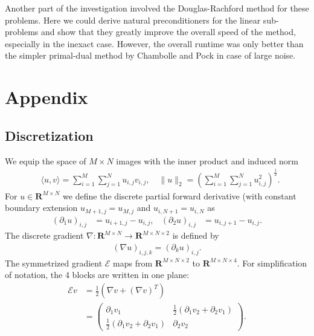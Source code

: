 \documentclass[twocolumn,envcountsame]{svjour3}
\newcommand{\RR}{\mathbf{R}}
\begin{document}
Another part of the investigation involved the Douglas-Rachford method for these problems. Here we could derive natural preconditioners for the linear sub-problems and show that they greatly improve the overall speed of the method, especially in the inexact case. However, the overall runtime was only better than the simpler primal-dual method by Chambolle and Pock in case of large noise.


\appendix
\section{Appendix}

\subsection{Discretization}
\label{sec:discretization}

We equip the space of  $M\times N$ images with the inner product and induced norm
\begin{align*}
  &\langle u,v\rangle=\sum_{i=1}^M\sum_{j=1}^N u_{i,j}v_{i,j},\quad \|u\|_2
  =\left(\sum_{i=1}^M\sum_{j=1}^N u_{i,j}^2\right)^{\frac{1}{2}}.
\end{align*}
 For $u\in\RR^{M\times N}$ we define the discrete partial forward derivative (with constant boundary
 extension $u_{M+1,j}=u_{M,j}$ and $u_{i,N+1}=u_{i,N}$ as
  \begin{align*}
    (\partial_1u)_{i,j}&=u_{i+1,j}-u_{i,j}, &
    (\partial_2u)_{i,j}&=u_{i,j+1}-u_{i,j}.
  \end{align*}
  The discrete gradient $\nabla:\RR^{M\times N}\to\RR^{M\times N\times 2}$ is defined by
  \begin{align*}
    (\nabla u)_{i,j,k}=(\partial_ku)_{i,j}.
  \end{align*}
 The symmetrized gradient $\mathcal{E}$ maps from $\RR^{M\times N \times 2}$ to $\RR^{M\times N\times
4}$. For simplification of notation, the 4 blocks are written in one plane:
\begin{align*}
  \mathcal{E}v&=\frac{1}{2}\left(\nabla v+(\nabla v)^T\right)\\
  &=
  \begin{pmatrix}
    \partial_1v_1 & \frac{1}{2}(\partial_1v_2+\partial_2v_1)\\
	\frac{1}{2}(\partial_1v_2+\partial_2v_1) & \partial_2v_2
      \end{pmatrix}.
\end{align*}
 
\end{document}
